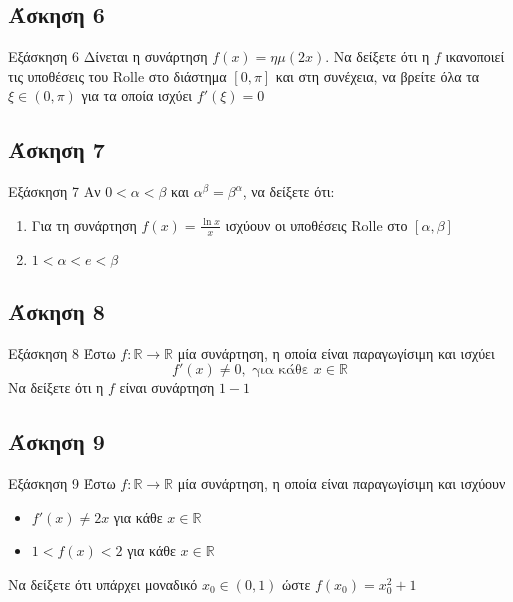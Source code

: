 \documentclass[greek]{beamer}
\begin{document}
\subsection{Άσκηση 6}
\begin{frame}[label=Άσκηση6]{Εξάσκηση 6}
 Δίνεται η συνάρτηση $f(x)=ημ(2x)$. Να δείξετε ότι η $f$ ικανοποιεί τις υποθέσεις του Rolle στο διάστημα $[0,π]$ και στη συνέχεια, να βρείτε όλα τα $ξ\in (0,π)$ για τα οποία ισχύει $f'(ξ)=0$
\end{frame}

\subsection{Άσκηση 7}
\begin{frame}[label=Άσκηση7]{Εξάσκηση 7}
 Αν $0<α<β$ και $α^β=β^α$, να δείξετε ότι:
 \begin{enumerate}
  \item<1-> Για τη συνάρτηση $f(x)=\frac{\ln x}{x}$ ισχύουν οι υποθέσεις Rolle στο $[α,β]$
  \item<2-> $1<α<e<β$
 \end{enumerate}
\end{frame}

\subsection{Άσκηση 8}
\begin{frame}[label=Άσκηση8]{Εξάσκηση 8}
 Έστω $f:\mathbb{R}\to\mathbb{R}$ μία συνάρτηση, η οποία είναι παραγωγίσιμη και ισχύει
 $$f'(x)\ne 0, \text{ για κάθε } x\in\mathbb{R}$$
 Να δείξετε ότι η $f$ είναι συνάρτηση $1-1$
\end{frame}

\subsection{Άσκηση 9}
\begin{frame}[label=Άσκηση9]{Εξάσκηση 9}
 Έστω $f:\mathbb{R}\to\mathbb{R}$ μία συνάρτηση, η οποία είναι παραγωγίσιμη και ισχύουν
 \begin{itemize}
  \item $f'(x)\ne 2x$ για κάθε $x\in\mathbb{R}$
  \item $1<f(x)<2$ για κάθε $x\in\mathbb{R}$
 \end{itemize}
 Να δείξετε ότι υπάρχει μοναδικό $x_0\in (0,1)$ ώστε $f(x_0)=x_0^2+1$
\end{frame}
\end{document}
